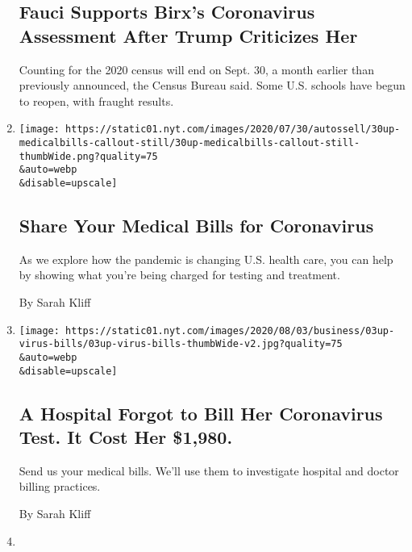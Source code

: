 \begin{enumerate}
{  \subsection{Fauci Supports Birx's Coronavirus Assessment After Trump
  Criticizes
  Her}\label{fauci-supports-birxs-coronavirus-assessment-after-trump-criticizes-her}}

  Counting for the 2020 census will end on Sept. 30, a month earlier
  than previously announced, the Census Bureau said. Some U.S. schools
  have begun to reopen, with fraught results.
\item
  \href{/2020/08/03/reader-center/coronavirus-medical-bills.html}{}

  \texttt{[image: https://static01.nyt.com/images/2020/07/30/autossell/30up-medicalbills-callout-still/30up-medicalbills-callout-still-thumbWide.png?quality=75\\\&auto=webp\\\&disable=upscale]}

  \hypertarget{share-your-medical-bills-for-coronavirus}{%
  \subsection{Share Your Medical Bills for
  Coronavirus}\label{share-your-medical-bills-for-coronavirus}}

  As we explore how the pandemic is changing U.S. health care, you can
  help by showing what you're being charged for testing and treatment.

  By Sarah Kliff
\item
  \href{/2020/08/03/upshot/nj-coronavirus-medical-bill.html}{}

  \texttt{[image: https://static01.nyt.com/images/2020/08/03/business/03up-virus-bills/03up-virus-bills-thumbWide-v2.jpg?quality=75\\\&auto=webp\\\&disable=upscale]}

  \hypertarget{a-hospital-forgot-to-bill-her-coronavirus-test-it-cost-her-1980-1}{%
  \subsection{A Hospital Forgot to Bill Her Coronavirus Test. It Cost
  Her
  \$1,980.}\label{a-hospital-forgot-to-bill-her-coronavirus-test-it-cost-her-1980-1}}

  Send us your medical bills. We'll use them to investigate hospital and
  doctor billing practices.

  By Sarah Kliff
\item
  \href{/2020/08/03/reader-center/healthcare-workers-coronavirus-care.html}{}


\end{enumerate}
